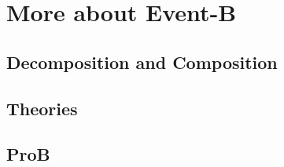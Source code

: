 \section{More about Event-B}

\subsection{Decomposition and Composition}

\subsection{Theories}

\subsection{ProB}

